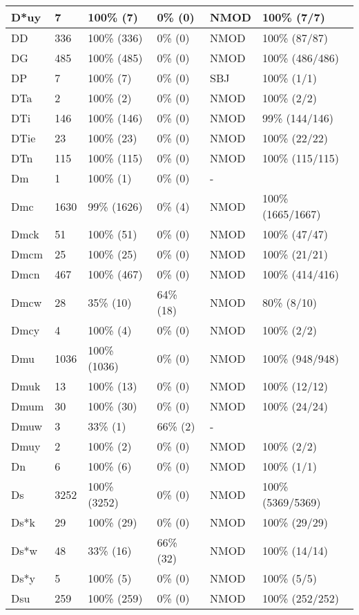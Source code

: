 \begin{figure*}
\begin{tabular}{|l|l|l|l||l|l|}
\hline
 D*uy & 7 & 100\% (7) & 0\% (0) & NMOD & 100\% (7/7) \\ 
\hline
 DD & 336 & 100\% (336) & 0\% (0) & NMOD & 100\% (87/87) \\ 
\hline
 DG & 485 & 100\% (485) & 0\% (0) & NMOD & 100\% (486/486) \\ 
\hline
 DP & 7 & 100\% (7) & 0\% (0) & SBJ & 100\% (1/1) \\ 
\hline
 DTa & 2 & 100\% (2) & 0\% (0) & NMOD & 100\% (2/2) \\ 
\hline
 DTi & 146 & 100\% (146) & 0\% (0) & NMOD & 99\% (144/146) \\ 
\hline
 DTie & 23 & 100\% (23) & 0\% (0) & NMOD & 100\% (22/22) \\ 
\hline
 DTn & 115 & 100\% (115) & 0\% (0) & NMOD & 100\% (115/115) \\ 
\hline
 Dm & 1 & 100\% (1) & 0\% (0) & - &  \\ 
\hline
 Dmc & 1630 & 99\% (1626) & 0\% (4) & NMOD & 100\% (1665/1667) \\ 
\hline
 Dmck & 51 & 100\% (51) & 0\% (0) & NMOD & 100\% (47/47) \\ 
\hline
 Dmcm & 25 & 100\% (25) & 0\% (0) & NMOD & 100\% (21/21) \\ 
\hline
 Dmcn & 467 & 100\% (467) & 0\% (0) & NMOD & 100\% (414/416) \\ 
\hline
 Dmcw & 28 & 35\% (10) & 64\% (18) & NMOD & 80\% (8/10) \\ 
\hline
 Dmcy & 4 & 100\% (4) & 0\% (0) & NMOD & 100\% (2/2) \\ 
\hline
 Dmu & 1036 & 100\% (1036) & 0\% (0) & NMOD & 100\% (948/948) \\ 
\hline
 Dmuk & 13 & 100\% (13) & 0\% (0) & NMOD & 100\% (12/12) \\ 
\hline
 Dmum & 30 & 100\% (30) & 0\% (0) & NMOD & 100\% (24/24) \\ 
\hline
 Dmuw & 3 & 33\% (1) & 66\% (2) & - &  \\ 
\hline
 Dmuy & 2 & 100\% (2) & 0\% (0) & NMOD & 100\% (2/2) \\ 
\hline
 Dn & 6 & 100\% (6) & 0\% (0) & NMOD & 100\% (1/1) \\ 
\hline
 Ds & 3252 & 100\% (3252) & 0\% (0) & NMOD & 100\% (5369/5369) \\ 
\hline
 Ds*k & 29 & 100\% (29) & 0\% (0) & NMOD & 100\% (29/29) \\ 
\hline
 Ds*w & 48 & 33\% (16) & 66\% (32) & NMOD & 100\% (14/14) \\ 
\hline
 Ds*y & 5 & 100\% (5) & 0\% (0) & NMOD & 100\% (5/5) \\ 
\hline
 Dsu & 259 & 100\% (259) & 0\% (0) & NMOD & 100\% (252/252) \\ 
\hline
\end{tabular}
\end{figure*}
